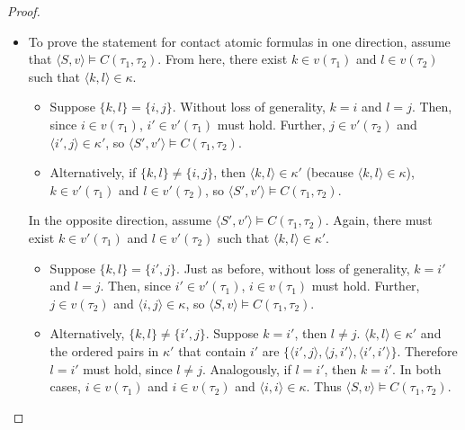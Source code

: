 \documentclass{article}
\newcommand{\lcont}{C}
\begin{document}
\begin{proof}
\begin{itemize}
\begin{itemize}
    \end{itemize}
  \item To prove the statement for contact atomic formulas in one direction, assume that $\langle S, v \rangle \models \lcont(\tau_1, \tau_2)$. From here, there exist $k \in v(\tau_1)$ and $l \in v(\tau_2)$ such that $\langle k, l \rangle \in \kappa$.
    \begin{itemize}
    \item Suppose $\{k, l\} = \{i, j\}$. Without loss of generality, $k = i$ and $l = j$. Then, since $i \in v(\tau_1)$, $i' \in v'(\tau_1)$ must hold. Further, $j \in v'(\tau_2)$ and $\langle i', j \rangle \in \kappa'$, so $\langle S', v' \rangle \models \lcont(\tau_1, \tau_2)$.
    \item Alternatively, if $\{k, l\} \neq \{i, j\}$, then $\langle k, l \rangle \in \kappa'$ (because $\langle k, l \rangle \in \kappa$), $k \in v'(\tau_1)$ and $l \in v'(\tau_2)$, so $\langle S', v' \rangle \models \lcont(\tau_1, \tau_2)$.
    \end{itemize}
    In the opposite direction, assume $\langle S', v' \rangle \models \lcont(\tau_1, \tau_2)$. Again, there must exist $k \in v'(\tau_1)$ and $l \in v'(\tau_2)$ such that $\langle k, l \rangle \in \kappa'$.
    \begin{itemize}
    \item Suppose $\{k, l\} = \{i', j\}$. Just as before, without loss of generality, $k = i'$ and $l = j$. Then, since $i' \in v'(\tau_1)$, $i \in v(\tau_1)$ must hold. Further, $j \in v(\tau_2)$ and $\langle i, j \rangle \in \kappa$, so $\langle S, v \rangle \models \lcont(\tau_1, \tau_2)$.
    \item
      Alternatively, $\{k, l\} \neq \{i', j\}$. Suppose $k = i'$, then $l \neq j$. $\langle k, l \rangle \in \kappa'$ and the ordered pairs in $\kappa'$ that contain $i'$ are $\{\langle i', j \rangle, \langle j, i' \rangle, \langle i', i' \rangle\}$. Therefore $l = i'$ must hold, since $l \neq j$. Analogously, if $l = i'$, then $k = i'$. In both cases, $i \in v(\tau_1)$ and $i \in v(\tau_2)$ and $\langle i, i \rangle \in \kappa$. Thus $\langle S, v \rangle \models \lcont(\tau_1, \tau_2)$.


\end{itemize}
\end{itemize}
\end{proof}
\end{document}
